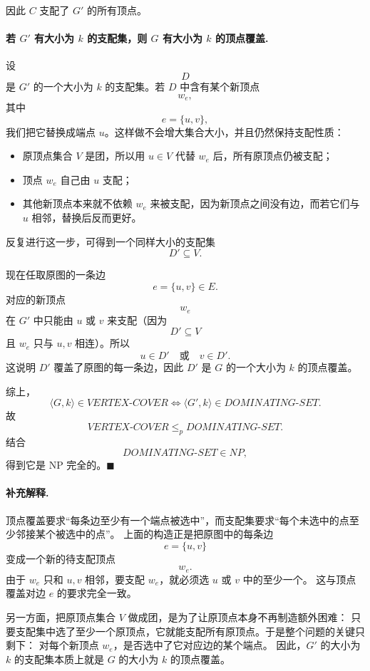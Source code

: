 \begin{answerred}
因此 $C$ 支配了 $G'$ 的所有顶点。

\paragraph{若 \(G'\) 有大小为 \(k\) 的支配集，则 \(G\) 有大小为 \(k\) 的顶点覆盖.}
设
\[
D
\]
是 $G'$ 的一个大小为 $k$ 的支配集。若 $D$ 中含有某个新顶点
\[
w_e,
\]
其中
\[
e=\{u,v\},
\]
我们把它替换成端点 $u$。这样做不会增大集合大小，并且仍然保持支配性质：

\begin{itemize}
  \item 原顶点集合 $V$ 是团，所以用 $u\in V$ 代替 $w_e$ 后，所有原顶点仍被支配；
  \item 顶点 $w_e$ 自己由 $u$ 支配；
  \item 其他新顶点本来就不依赖 $w_e$ 来被支配，因为新顶点之间没有边，而若它们与 $u$ 相邻，替换后反而更好。
\end{itemize}

反复进行这一步，可得到一个同样大小的支配集
\[
D'\subseteq V.
\]

现在任取原图的一条边
\[
e=\{u,v\}\in E.
\]
对应的新顶点
\[
w_e
\]
在 $G'$ 中只能由 $u$ 或 $v$ 来支配（因为
\[
D'\subseteq V
\]
且 $w_e$ 只与 $u,v$ 相连）。所以
\[
u\in D'
\quad\text{或}\quad
v\in D'.
\]
这说明 $D'$ 覆盖了原图的每一条边，因此 $D'$ 是 $G$ 的一个大小为 $k$ 的顶点覆盖。

\medskip
综上，
\[
\langle G,k\rangle\in VERTEX\text{-}COVER
\iff
\langle G',k\rangle\in DOMINATING\text{-}SET.
\]
故
\[
VERTEX\text{-}COVER\le_p DOMINATING\text{-}SET.
\]
结合
\[
DOMINATING\text{-}SET\in NP,
\]
得到它是 NP 完全的。$\blacksquare$

\paragraph{补充解释.}
顶点覆盖要求“每条边至少有一个端点被选中”，而支配集要求“每个未选中的点至少邻接某个被选中的点”。
上面的构造正是把原图中的每条边
\[
e=\{u,v\}
\]
变成一个新的待支配顶点
\[
w_e.
\]
由于 $w_e$ 只和 $u,v$ 相邻，要支配 $w_e$，就必须选 $u$ 或 $v$ 中的至少一个。
这与顶点覆盖对边 $e$ 的要求完全一致。

另一方面，把原顶点集合 $V$ 做成团，是为了让原顶点本身不再制造额外困难：
只要支配集中选了至少一个原顶点，它就能支配所有原顶点。于是整个问题的关键只剩下：
对每个新顶点 $w_e$，是否选中了它对应边的某个端点。
因此，$G'$ 的大小为 $k$ 的支配集本质上就是 $G$ 的大小为 $k$ 的顶点覆盖。

\end{answerred}
